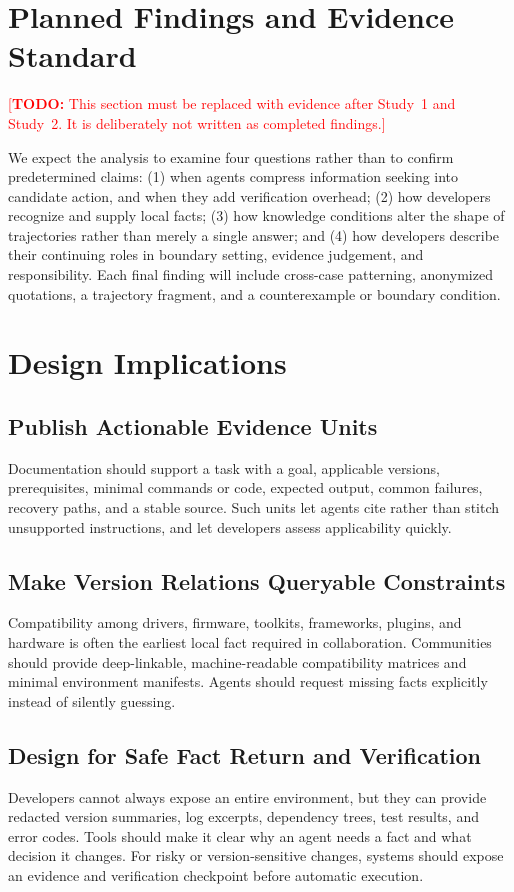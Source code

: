 \documentclass[manuscript,review,anonymous]{acmart}
\newcommand{\todo}[1]{\textcolor{red}{[\textbf{TODO:} #1]}}
\begin{document}
\section{Planned Findings and Evidence Standard}

\todo{This section must be replaced with evidence after Study~1 and Study~2. It is deliberately not written as completed findings.}

We expect the analysis to examine four questions rather than to confirm predetermined claims: (1) when agents compress information seeking into candidate action, and when they add verification overhead; (2) how developers recognize and supply local facts; (3) how knowledge conditions alter the shape of trajectories rather than merely a single answer; and (4) how developers describe their continuing roles in boundary setting, evidence judgement, and responsibility. Each final finding will include cross-case patterning, anonymized quotations, a trajectory fragment, and a counterexample or boundary condition.

\section{Design Implications}

\subsection{Publish Actionable Evidence Units}
Documentation should support a task with a goal, applicable versions, prerequisites, minimal commands or code, expected output, common failures, recovery paths, and a stable source. Such units let agents cite rather than stitch unsupported instructions, and let developers assess applicability quickly.

\subsection{Make Version Relations Queryable Constraints}
Compatibility among drivers, firmware, toolkits, frameworks, plugins, and hardware is often the earliest local fact required in collaboration. Communities should provide deep-linkable, machine-readable compatibility matrices and minimal environment manifests. Agents should request missing facts explicitly instead of silently guessing.

\subsection{Design for Safe Fact Return and Verification}
Developers cannot always expose an entire environment, but they can provide redacted version summaries, log excerpts, dependency trees, test results, and error codes. Tools should make it clear why an agent needs a fact and what decision it changes. For risky or version-sensitive changes, systems should expose an evidence and verification checkpoint before automatic execution.
\end{document}
